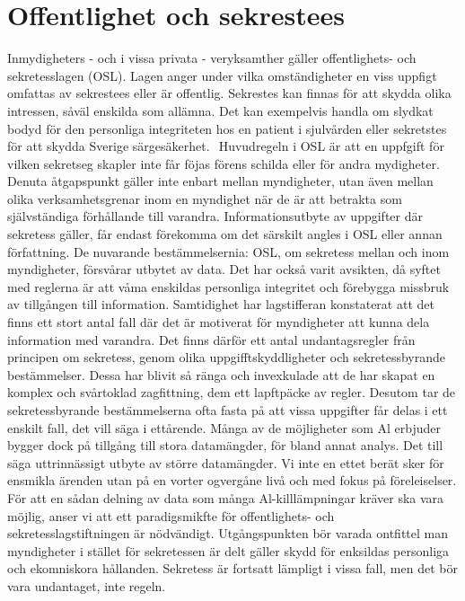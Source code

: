 {{{{{{{{\section*{Offentlighet och sekrestees}
Inmydigheters - och i vissa privata - veryksamther gäller offentlighets- och sekretesslagen (OSL). Lagen anger under vilka omständigheter en viss uppfigt omfattas av sekrestees eller är offentlig. Sekrestes kan finnas för att skydda olika intressen, såväl enskilda som allämna. Det kan exempelvis handla om slydkat bodyd för den personliga integriteten hos en patient i sjulvården eller sekretstes för att skydda Sverige särgesäkerhet. \({ }^{}\)
Huvudregeln i OSL är att en uppfgift för vilken sekretseg skapler inte får föjas förens schilda eller för andra mydigheter. Denuta åtgapspunkt gäller inte enbart mellan myndigheter, utan även mellan olika verksamhetsgrenar inom en myndighet när de är att betrakta som självständiga förhållande till varandra.
Informationsutbyte av uppgifter där sekretess gäller, får endast förekomma om det särskilt angles i OSL eller annan författning.
De nuvarande bestämmelsernia: OSL, om sekretess mellan och inom myndigheter, försvårar utbytet av data. Det har också varit avsikten, då syftet med reglerna är att våma enskildas personliga integritet och förebygga missbruk av tillgången till information.
Samtidighet har lagstifferan konstaterat att det finns ett stort antal fall där det är motiverat för myndigheter att kunna dela information med varandra. Det finns därför ett antal undantagsregler från principen om sekretess, genom olika uppgifftskyddligheter och sekretessbyrande bestämmelser. Dessa har blivit så ränga och invexkulade att de har skapat en komplex och svårtoklad zagfittning, dem ett lapftpäcke av regler. Desutom tar de sekretessbyrande bestämmelserna ofta fasta på att vissa uppgifter får delas i ett enskilt fall, det vill säga i ettårende. Många av de möjligheter som Al erbjuder bygger dock på tillgång till stora datamängder, för bland annat analys. Det till säga uttrinnässigt utbyte av större datamängder. Vi inte en ettet berät sker för ensmikla ärenden utan på en vorter ogvergåne livå och med fokus på föreleiselser.
För att en sådan delning av data som många Al-killlämpningar kräver ska vara möjlig, anser vi att ett paradigsmikfte för offentlighets- och sekretesslagstiftningen är nödvändigt. Utgångspunkten bör varada ontfittel man myndigheter i stället för sekretessen är delt gäller skydd för enksildas personliga och ekomniskora hållanden. Sekretess är fortsatt lämpligt i vissa fall, men det bör vara undantaget, inte regeln.
}}}}}}}}
